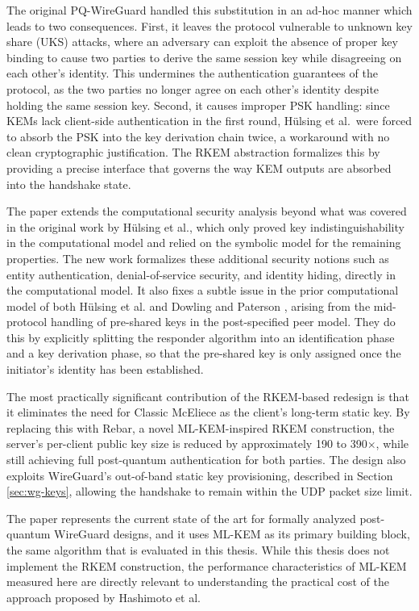 The original PQ-WireGuard handled this substitution in an ad-hoc manner which leads to two consequences. First, it leaves the protocol vulnerable to unknown key share (UKS) attacks, where an adversary can exploit the absence of proper key binding to cause two parties to derive the same session key while disagreeing on each other's identity. This undermines the authentication guarantees of the protocol, as the two parties no longer agree on each other's identity despite holding the same session key.
Second, it causes improper PSK handling: since KEMs lack client-side authentication in the first round, Hülsing et al.\ were forced to absorb the PSK into the key derivation chain twice, a workaround with no clean cryptographic justification. The RKEM abstraction formalizes this by providing a precise interface that governs the way KEM outputs are absorbed into the handshake state.

The paper extends the computational security analysis beyond what was covered in the original work by Hülsing et al., which only proved key indistinguishability in the computational model and relied on the symbolic model for the remaining properties. The new work formalizes these additional security notions such as entity authentication, denial-of-service security, and identity hiding, directly in the computational model. It also fixes a subtle issue in the prior computational model of both Hülsing et al. and Dowling and Paterson \cite{dowling2018wireguard}, arising from the mid-protocol handling of pre-shared keys in the post-specified peer model. They do this by explicitly splitting the responder algorithm into an identification phase and a key derivation phase, so that the pre-shared key is only assigned once the initiator's identity has been established.

The most practically significant contribution of the RKEM-based redesign is that it eliminates the need for Classic McEliece as the client's long-term static key. By replacing this with Rebar, a novel ML-KEM-inspired RKEM construction, the server's per-client public key size is reduced by approximately 190 to 390$\times$, while still achieving full post-quantum authentication for both parties. The design also exploits WireGuard's out-of-band static key provisioning, described in Section \ref{sec:wg-keys}, allowing the handshake to remain within the UDP packet size limit.

The paper represents the current state of the art for formally analyzed post-quantum WireGuard designs, and it uses ML-KEM as its primary building block, the same algorithm that is evaluated in this thesis. While this thesis does not implement the RKEM construction, the performance characteristics of ML-KEM measured here are directly relevant to understanding the practical cost of the approach proposed by Hashimoto et al.

